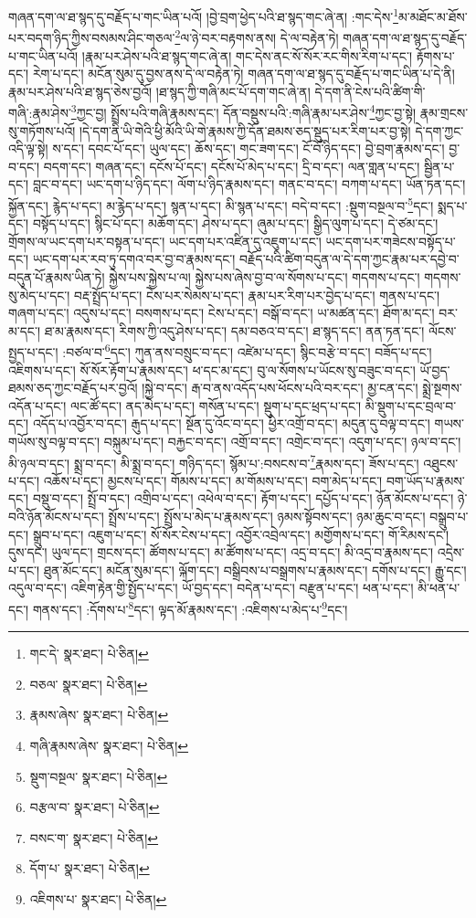 གཞན་དག་ལ་ཐ་སྙད་དུ་བརྗོད་པ་གང་ཡིན་པའོ། །བྱེ་བྲག་ཕྱེད་པའི་ཐ་སྙད་གང་ཞེ་ན། :གང་དེས་\footnote{གང་དེ་  སྣར་ཐང་།  པེ་ཅིན། }མ་མཐོང་མ་ཐོས་པར་བདག་ཉིད་ཀྱིས་བསམས་ཤིང་གཅལ་\footnote{བཅལ་  སྣར་ཐང་།  པེ་ཅིན། }ལ་ཉེ་བར་བརྟགས་ནས། དེ་ལ་བརྟེན་ཏེ། གཞན་དག་ལ་ཐ་སྙད་དུ་བརྗོད་པ་གང་ཡིན་པའོ། །རྣམ་པར་ཤེས་པའི་ཐ་སྙད་གང་ཞེ་ན། གང་དེས་ནང་སོ་སོར་རང་གིས་རིག་པ་དང་། རྟོགས་པ་དང་། རེག་པ་དང་། མངོན་སུམ་དུ་བྱས་ནས་དེ་ལ་བརྟེན་ཏེ། གཞན་དག་ལ་ཐ་སྙད་དུ་བརྗོད་པ་གང་ཡིན་པ་དེ་ནི། རྣམ་པར་ཤེས་པའི་ཐ་སྙད་ཅེས་བྱའོ། །ཐ་སྙད་ཀྱི་གཞི་མང་པོ་དག་གང་ཞེ་ན། དེ་དག་ནི་ངེས་པའི་ཚིག་གི་གཞི་:རྣམ་ཤེས་\footnote{རྣམས་ཞེས་  སྣར་ཐང་།  པེ་ཅིན། }ཀྱང་བྱ། སྤྲོས་པའི་གཞི་རྣམས་དང་། དོན་བསྡུས་པའི་:གཞི་རྣམ་པར་ཤེས་\footnote{གཞི་རྣམས་ཞེས་  སྣར་ཐང་།  པེ་ཅིན། }ཀྱང་བྱ་སྟེ། རྣམ་གྲངས་སུ་གཏོགས་པའོ། །དེ་དག་ནི་ཡི་གེའི་ཕྱི་མོའི་ཡི་གེ་རྣམས་ཀྱི་དོན་ཐམས་ཅད་སྡུད་པར་རིག་པར་བྱ་སྟེ། དེ་དག་ཀྱང་འདི་ལྟ་སྟེ། ས་དང་། དབང་པོ་དང་། ཡུལ་དང་། ཆོས་དང་། གང་ཟག་དང་། ངོ་བོ་ཉིད་དང་། བྱེ་བྲག་རྣམས་དང་། བྱ་བ་དང་། བདག་དང་། གཞན་དང་། དངོས་པོ་དང་། དངོས་པོ་མེད་པ་དང་། དྲི་བ་དང་། ལན་གླན་པ་དང་། སྦྱིན་པ་དང་། བླང་བ་དང་། ཡང་དག་པ་ཉིད་དང་། ལོག་པ་ཉིད་རྣམས་དང་། གནང་བ་དང་། བཀག་པ་དང་། ཡོན་ཏན་དང་། སྐྱོན་དང་། རྙེད་པ་དང་། མ་རྙེད་པ་དང་། སྙན་པ་དང་། མི་སྙན་པ་དང་། བདེ་བ་དང་། :སྡུག་བསྔལ་བ་\footnote{སྡུག་བསྔལ་  སྣར་ཐང་།  པེ་ཅིན། }དང་། སྨད་པ་དང་། བསྟོད་པ་དང་། སྙིང་པོ་དང་། མཆོག་དང་། ཤེས་པ་དང་། ཞུམ་པ་དང་། སྒྱིད་ལུག་པ་དང་། དེ་ཙམ་དང་། གྲོགས་ལ་ཡང་དག་པར་བསྟན་པ་དང་། ཡང་དག་པར་འཛིན་དུ་འཇུག་པ་དང་། ཡང་དག་པར་གཟེངས་བསྟོད་པ་དང་། ཡང་དག་པར་རབ་ཏུ་དགའ་བར་བྱ་བ་རྣམས་དང་། བརྗོད་པའི་ཚིག་བདུན་ལ་དེ་དག་ཀྱང་རྣམ་པར་དབྱེ་བ་བདུན་པོ་རྣམས་ཡིན་ཏེ། སྐྱེས་པས་སྐྱེས་པ་ལ། སྐྱེས་པས་ཞེས་བྱ་བ་ལ་སོགས་པ་དང་། གདགས་པ་དང་། གདགས་སུ་མེད་པ་དང་། བརྡ་སྤྲོད་པ་དང་། ངེས་པར་སེམས་པ་དང་། རྣམ་པར་རིག་པར་བྱེད་པ་དང་། གནས་པ་དང་། གཞག་པ་དང་། འདུས་པ་དང་། བསགས་པ་དང་། ངེས་པ་དང་། བསྒོ་བ་དང་། ཡ་མཚན་དང་། ཐོག་མ་དང་། བར་མ་དང་། ཐ་མ་རྣམས་དང་། རིགས་ཀྱི་འདུ་ཤེས་པ་དང་། དམ་བཅའ་བ་དང་། ཐ་སྙད་དང་། ནན་ཏན་དང་། ལོངས་སྤྱད་པ་དང་། :བཙལ་བ་\footnote{བརྩལ་བ་  སྣར་ཐང་།  པེ་ཅིན། }དང་། ཀུན་ནས་བསྲུང་བ་དང་། འཛེམ་པ་དང་། སྙིང་བརྩེ་བ་དང་། བཟོད་པ་དང་། འཇིགས་པ་དང་། སོ་སོར་རྟོག་པ་རྣམས་དང་། ཕ་དང་མ་དང་། བུ་ལ་སོགས་པ་ཡོངས་སུ་བཟུང་བ་དང་། ཡོ་བྱད་ཐམས་ཅད་ཀྱང་བརྗོད་པར་བྱའོ། །སྐྱེ་བ་དང་། རྒ་བ་ནས་འདོད་པས་ཕོངས་པའི་བར་དང་། མྱ་ངན་དང་། སྨྲེ་སྔགས་འདོན་པ་དང་། ལང་ཚོ་དང་། ནད་མེད་པ་དང་། གསོན་པ་དང་། སྡུག་པ་དང་ཕྲད་པ་དང་། མི་སྡུག་པ་དང་བྲལ་བ་དང་། འདོད་པ་འབྱོར་བ་དང་། རྒུད་པ་དང་། སྔོན་དུ་འོང་བ་དང་། ཕྱིར་འགྲོ་བ་དང་། མདུན་དུ་བལྟ་བ་དང་། གཡས་གཡོས་སུ་བལྟ་བ་དང་། བསྐུམ་པ་དང་། བརྐྱང་བ་དང་། འགྲོ་བ་དང་། འགྲེང་བ་དང་། འདུག་པ་དང་། ཉལ་བ་དང་། མི་ཉལ་བ་དང་། སྨྲ་བ་དང་། མི་སྨྲ་བ་དང་། གཉིད་དང་། སྙོམ་པ་:བསངས་བ་\footnote{བསང་ག་  སྣར་ཐང་།  པེ་ཅིན། }རྣམས་དང་། ཟོས་པ་དང་། འཐུངས་པ་དང་། འཆོས་པ་དང་། མྱངས་པ་དང་། གོམས་པ་དང་། མ་གོམས་པ་དང་། བག་མེད་པ་དང་། བག་ཡོད་པ་རྣམས་དང་། བསྡུ་བ་དང་། སྤྲོ་བ་དང་། འགྲིབ་པ་དང་། འཕེལ་བ་དང་། རྟོག་པ་དང་། དཔྱོད་པ་དང་། ཉོན་མོངས་པ་དང་། ཉེ་བའི་ཉོན་མོངས་པ་དང་། སྤྲོས་པ་དང་། སྤྲོས་པ་མེད་པ་རྣམས་དང་། ཉམས་སྟོབས་དང་། ཉམ་ཆུང་བ་དང་། བསྒྲུབ་པ་དང་། སྒྲུབ་པ་དང་། འཇུག་པ་དང་། སོ་སོར་ངེས་པ་དང་། འབྱོར་འབྲེལ་དང་། མགྱོགས་པ་དང་། གོ་རིམས་དང་། དུས་དང་། ཡུལ་དང་། གྲངས་དང་། ཚོགས་པ་དང་། མ་ཚོགས་པ་དང་། འདྲ་བ་དང་། མི་འདྲ་བ་རྣམས་དང་། འདྲེས་པ་དང་། ཐུན་མོང་དང་། མངོན་སུམ་དང་། ལྐོག་དང་། བསྒྲིབས་པ་བསྒྲགས་པ་རྣམས་དང་། དགོས་པ་དང་། རྒྱུ་དང་། འདུལ་བ་དང་། འཇིག་རྟེན་གྱི་སྤྱོད་པ་དང་། ཡོ་བྱད་དང་། བདེན་པ་དང་། བརྫུན་པ་དང་། ཕན་པ་དང་། མི་ཕན་པ་དང་། གནས་དང་། :དོགས་པ་\footnote{དོག་པ་  སྣར་ཐང་།  པེ་ཅིན། }དང་། ལྟད་མོ་རྣམས་དང་། :འཇིགས་པ་མེད་པ་\footnote{འཇིགས་པ་  སྣར་ཐང་།  པེ་ཅིན། }དང་། 